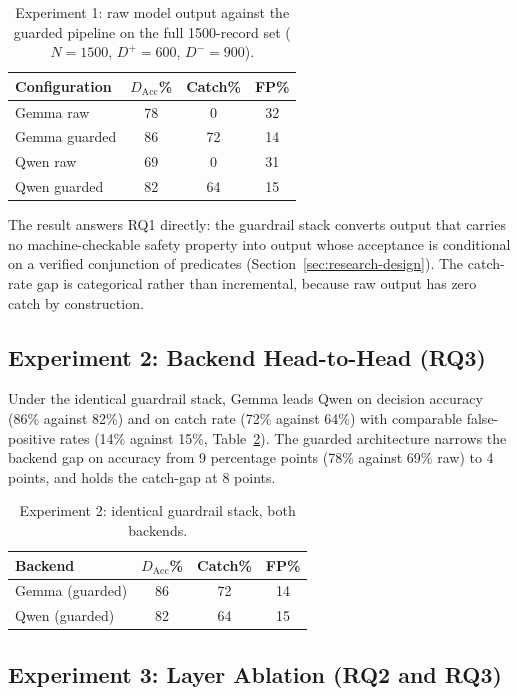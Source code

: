 \begin{table}[h]
\centering
\small
\caption{Experiment 1: raw model output against the guarded pipeline on the
full 1500-record set ($N{=}1500$, $D^+{=}600$, $D^-{=}900$).}\label{tab:exp1}
\begin{tabular}{@{}lccc@{}}
\toprule
Configuration & $D_{\mathrm{Acc}}$\% & Catch\% & FP\%\\
\midrule
Gemma raw      & 78 & 0  & 32\\
Gemma guarded  & 86 & 72 & 14\\
Qwen raw       & 69 & 0  & 31\\
Qwen guarded   & 82 & 64 & 15\\
\bottomrule
\end{tabular}
\end{table}

The result answers RQ1 directly: the guardrail stack converts output that
carries no machine-checkable safety property into output whose acceptance is
conditional on a verified conjunction of predicates (Section~\ref{sec:research-design}).
The catch-rate gap is categorical rather than incremental, because raw output
has zero catch by construction.

\subsection{Experiment 2: Backend Head-to-Head (RQ3)}\label{sec:exp2}

Under the identical guardrail stack, Gemma leads Qwen on decision accuracy
(86\% against 82\%) and on catch rate (72\% against 64\%) with comparable
false-positive rates (14\% against 15\%, Table~\ref{tab:exp2}). The guarded
architecture narrows the backend gap on accuracy from 9 percentage points
(78\% against 69\% raw) to 4 points, and holds the catch-gap at 8 points.

\begin{table}[h]
\centering
\small
\caption{Experiment 2: identical guardrail stack, both backends.}\label{tab:exp2}
\begin{tabular}{@{}lccc@{}}
\toprule
Backend & $D_{\mathrm{Acc}}$\% & Catch\% & FP\%\\
\midrule
Gemma (guarded) & 86 & 72 & 14\\
Qwen (guarded)  & 82 & 64 & 15\\
\bottomrule
\end{tabular}
\end{table}

\subsection{Experiment 3: Layer Ablation (RQ2 and RQ3)}\label{sec:exp3}

